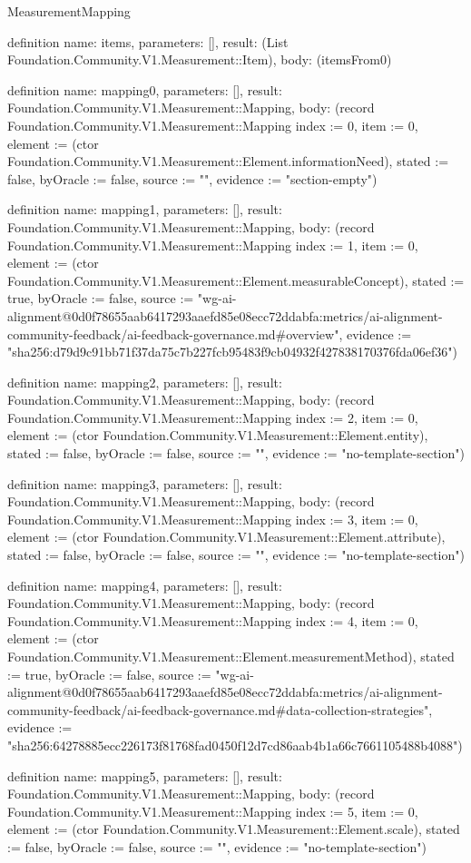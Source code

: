 \begin{lexlean}{MeasurementMapping}
\begin{semanticmodule}
definition{
  name: items,
  parameters: [],
  result: (List Foundation.Community.V1.Measurement::Item),
  body: (itemsFrom0)
}

definition{
  name: mapping0,
  parameters: [],
  result: Foundation.Community.V1.Measurement::Mapping,
  body: (record Foundation.Community.V1.Measurement::Mapping {index := 0, item := 0, element := (ctor Foundation.Community.V1.Measurement::Element.informationNeed), stated := false, byOracle := false, source := "", evidence := "section-empty"})
}

definition{
  name: mapping1,
  parameters: [],
  result: Foundation.Community.V1.Measurement::Mapping,
  body: (record Foundation.Community.V1.Measurement::Mapping {index := 1, item := 0, element := (ctor Foundation.Community.V1.Measurement::Element.measurableConcept), stated := true, byOracle := false, source := "wg-ai-alignment@0d0f78655aab6417293aaefd85e08ecc72ddabfa:metrics/ai-alignment-community-feedback/ai-feedback-governance.md#overview", evidence := "sha256:d79d9c91bb71f37da75c7b227fcb95483f9cb04932f427838170376fda06ef36"})
}

definition{
  name: mapping2,
  parameters: [],
  result: Foundation.Community.V1.Measurement::Mapping,
  body: (record Foundation.Community.V1.Measurement::Mapping {index := 2, item := 0, element := (ctor Foundation.Community.V1.Measurement::Element.entity), stated := false, byOracle := false, source := "", evidence := "no-template-section"})
}

definition{
  name: mapping3,
  parameters: [],
  result: Foundation.Community.V1.Measurement::Mapping,
  body: (record Foundation.Community.V1.Measurement::Mapping {index := 3, item := 0, element := (ctor Foundation.Community.V1.Measurement::Element.attribute), stated := false, byOracle := false, source := "", evidence := "no-template-section"})
}

definition{
  name: mapping4,
  parameters: [],
  result: Foundation.Community.V1.Measurement::Mapping,
  body: (record Foundation.Community.V1.Measurement::Mapping {index := 4, item := 0, element := (ctor Foundation.Community.V1.Measurement::Element.measurementMethod), stated := true, byOracle := false, source := "wg-ai-alignment@0d0f78655aab6417293aaefd85e08ecc72ddabfa:metrics/ai-alignment-community-feedback/ai-feedback-governance.md#data-collection-strategies", evidence := "sha256:64278885ecc226173f81768fad0450f12d7cd86aab4b1a66c7661105488b4088"})
}

definition{
  name: mapping5,
  parameters: [],
  result: Foundation.Community.V1.Measurement::Mapping,
  body: (record Foundation.Community.V1.Measurement::Mapping {index := 5, item := 0, element := (ctor Foundation.Community.V1.Measurement::Element.scale), stated := false, byOracle := false, source := "", evidence := "no-template-section"})
}


\end{semanticmodule}
\end{lexlean}
